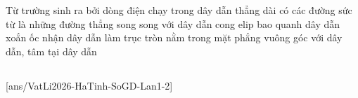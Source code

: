 	\begin{ex}%
		Từ trường sinh ra bởi dòng điện chạy trong dây dẫn thẳng dài có các đường sức từ là những đường
		\choice
		{thẳng song song với dây dẫn}
		{cong elip bao quanh dây dẫn}
		{xoắn ốc nhận dây dẫn làm trục}
		{\True tròn nằm trong mặt phẳng vuông góc với dây dẫn, tâm tại dây dẫn}
	\end{ex}

	\subsection*{}
	\setcounter{ex}{0}
	[ans/VatLi2026-HaTinh-SoGD-Lan1-2]

